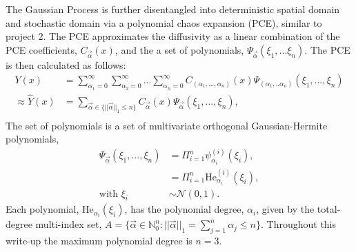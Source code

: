\documentclass[letterpaper, 10 pt, conference, twocolumn]{ieeeconf}  %
\begin{document}
The Gaussian Process is further disentangled into deterministic spatial domain and stochastic domain via a polynomial chaos expansion (PCE), similar to project 2. The PCE approximates the diffusivity as a linear combination of the PCE coefficients, $C_{\vec\alpha}(x)$, and the a set of polynomials, $\Psi_{\vec\alpha}(\xi_1,...\xi_n)$. The PCE is then calculated as follows:
\begin{equation}
\begin{aligned}
Y(x) &= \sum_{\alpha_1=0}^\infty\sum_{\alpha_2=0}^\infty...\sum_{\alpha_n=0}^\infty C_{(\alpha_1, ..., \alpha_n)}(x)\Psi_{(\alpha_1, ..\alpha_n)}(\xi_1, ..., \xi_n)\\
\approx \hat Y(x) &= \sum_{\vec\alpha\in\{\lvert\lvert\vec\alpha \rvert\rvert_1 \leq n\}} C_{\vec\alpha}(x) \Psi_{\vec\alpha}(\xi_1, ..., \xi_n), \\
\end{aligned}
\label{eq:pce}
\end{equation}
The set of polynomials is a set of multivariate orthogonal Gaussian-Hermite polynomials, 
\begin{equation}
\begin{aligned}
\Psi_{\vec \alpha}(\xi_1, ..., \xi_n) &= \Pi_{i=1}^n \psi_{\alpha_i}^{(i)}(\xi_i),\\
&= \Pi_{i=1}^n \text{He}_{\alpha_i}^{(i)}(\xi_i), \\
\text{with } \xi_i &\sim \mathcal{N}(0,1).
\end{aligned}
\label{eq:gauss_herm_poly}
\end{equation}
Each polynomial, $\text{He}_{\alpha_i}(\xi_i)$, has the polynomial degree, $\alpha_i$, given by the total-degree multi-index set, $A=\{\vec \alpha \in \mathds{N}_0^{n}: \lvert \lvert \vec \alpha \rvert\rvert_1 = \sum_{j=1}^n\alpha_j \leq n\}$. Throughout this write-up the maximum polynomial degree is $n=3$.
\end{document}
